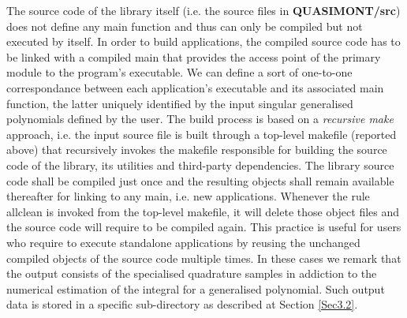 \documentclass[a4paper, twosided]{book}
\begin{document}
\vspace{0.25cm}

\noindent
The source code of the library itself (i.e. the source files in \colorbox{poliGrayBlue}{\textbf{QUASIMONT/src}}) does not define any \colorbox{poliGrayBlue}{main} function and thus can only be compiled but not executed by itself. In order to build applications, the compiled source code has to be linked with a compiled \colorbox{poliGrayBlue}{main} that provides the access point of the primary module to the program's executable. We can define a sort of one-to-one correspondance between each application's executable and its associated \colorbox{poliGrayBlue}{main} function, the latter uniquely identified by the input singular generalised polynomials defined by the user. The build process is based on a \textsl{recursive make} approach, i.e. the input source file is built through a top-level \colorbox{poliGrayBlue}{makefile} (reported above) that recursively invokes the \colorbox{poliGrayBlue}{makefile} responsible for building the source code of the library, its utilities and third-party dependencies. The library source code shall be compiled just once and the resulting objects shall remain available thereafter for linking to any \colorbox{poliGrayBlue}{main}, i.e. new applications. Whenever the rule \colorbox{poliGrayBlue}{allclean} is invoked from the top-level \colorbox{poliGrayBlue}{makefile}, it will delete those object files and the source code will require to be compiled again. This practice is useful for users who require to execute standalone applications by reusing the unchanged compiled objects of the source code multiple times. In these cases we remark that the output consists of the specialised quadrature samples in addiction to the numerical estimation of the integral for a generalised polynomial. Such output data is stored in a specific sub-directory as described at Section \ref{Sec3.2}.
\end{document}
